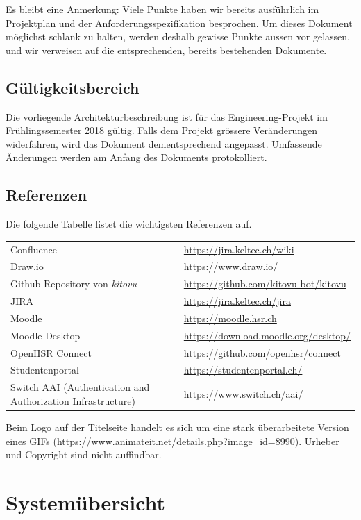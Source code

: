 \documentclass[a4paper]{article}
\let\oldsection\section
\renewcommand\section{\clearpage\oldsection}
\def\jiraurl{https://jira.keltec.ch/jira}
\def\confluenceurl{https://jira.keltec.ch/wiki}
\begin{document}
Es bleibt eine Anmerkung: Viele Punkte haben wir bereits ausführlich im Projektplan und der Anforderungsspezifikation besprochen. Um dieses Dokument möglichst schlank zu halten, werden deshalb gewisse Punkte aussen vor gelassen, und wir verweisen auf die entsprechenden, bereits bestehenden Dokumente.

\subsection{Gültigkeitsbereich}
Die vorliegende Architekturbeschreibung ist für das Engineering-Projekt im Frühlingssemester 2018 gültig. Falls dem Projekt grössere Veränderungen widerfahren, wird das Dokument dementsprechend angepasst. Umfassende Änderungen werden am Anfang des Dokuments protokolliert.

\subsection{Referenzen}
Die folgende Tabelle listet die wichtigsten Referenzen auf.

\begin{tabulary}{\linewidth}{Ll}
	Confluence & \url{\confluenceurl} \\
	Draw.io & \url{https://www.draw.io/} \\
	Github-Repository von \emph{kitovu} & \url{https://github.com/kitovu-bot/kitovu} \\
	JIRA	& \url{\jiraurl} \\
	Moodle & \url{https://moodle.hsr.ch} \\
	Moodle Desktop & \url{https://download.moodle.org/desktop/} \\
	OpenHSR Connect & \url{https://github.com/openhsr/connect} \\
	Studentenportal & \url{https://studentenportal.ch/} \\
	Switch AAI \newline (Authentication and Authorization Infrastructure)& \url{https://www.switch.ch/aai/} \\
\end{tabulary}

Beim Logo auf der Titelseite handelt es sich um eine stark überarbeitete Version eines GIFs (\url{https://www.animateit.net/details.php?image_id=8990}). Urheber und Copyright sind nicht auffindbar.

\pagebreak

\section{Systemübersicht}
\end{document}

